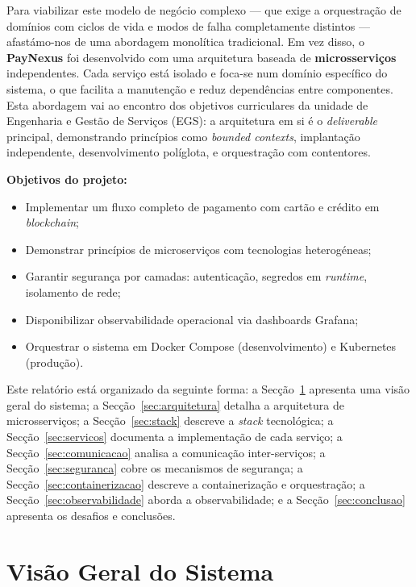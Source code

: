 \documentclass[12pt,a4paper]{article}
\begin{document}
Para viabilizar este modelo de negócio complexo — que exige a orquestração de domínios com 
ciclos de vida e modos de falha completamente distintos — afastámo-nos de uma abordagem 
monolítica tradicional. Em vez disso, o \textbf{PayNexus} foi desenvolvido com uma arquitetura baseada de \textbf{microsserviços} independentes. Cada serviço está isolado e foca-se num domínio específico do sistema, o que facilita a manutenção e reduz dependências entre componentes. Esta abordagem vai ao encontro dos objetivos curriculares da unidade de Engenharia e Gestão de Serviços (EGS): a arquitetura em si é o \emph{deliverable} principal, demonstrando princípios como \emph{bounded contexts}, implantação independente, desenvolvimento políglota, e
orquestração com contentores.

\textbf{Objetivos do projeto:}
\begin{itemize}[noitemsep]
  \item Implementar um fluxo completo de pagamento com cartão e crédito em \emph{blockchain};
  \item Demonstrar princípios de microserviços com tecnologias heterogéneas;
  \item Garantir segurança por camadas: autenticação, segredos em \emph{runtime}, isolamento de rede;
  \item Disponibilizar observabilidade operacional via dashboards Grafana;
  \item Orquestrar o sistema em Docker Compose (desenvolvimento) e Kubernetes (produção).
\end{itemize}

Este relatório está organizado da seguinte forma: a Secção~\ref{sec:visao} apresenta
uma visão geral do sistema; a Secção~\ref{sec:arquitetura} detalha a arquitetura de
microsserviços; a Secção~\ref{sec:stack} descreve a \emph{stack} tecnológica; a
Secção~\ref{sec:servicos} documenta a implementação de cada serviço; a
Secção~\ref{sec:comunicacao} analisa a comunicação inter-serviços; a
Secção~\ref{sec:seguranca} cobre os mecanismos de segurança; a
Secção~\ref{sec:containerizacao} descreve a containerização e orquestração; a
Secção~\ref{sec:observabilidade} aborda a observabilidade; e a
Secção~\ref{sec:conclusao} apresenta os desafios e conclusões.

\section{Visão Geral do Sistema}
\label{sec:visao}
\end{document}
